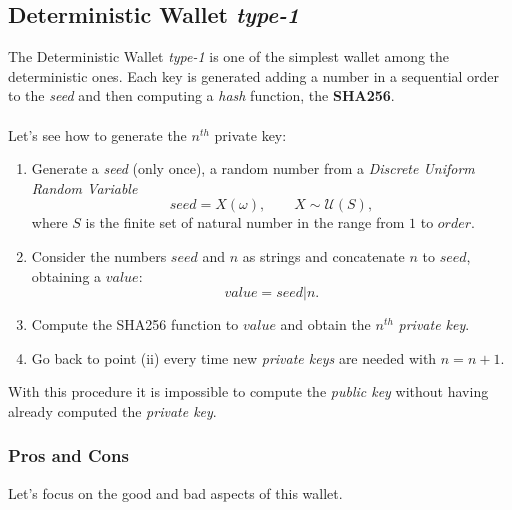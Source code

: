 \subsection{Deterministic Wallet \textit{type-1}}
The Deterministic Wallet \textit{type-1} is one of the simplest wallet among the deterministic ones. Each key is generated adding a number in a sequential order to the \textit{seed} and then computing a \textit{hash} function, the \textbf{SHA256}.
\\ \\
Let's see how to generate the $n^{th}$ private key:

\begin{enumerate}[label=(\roman*)]
	\item Generate a \textit{seed} (only once), a random number from a \textit{Discrete Uniform Random Variable}
	\begin{equation*}
	seed=X(\omega), \qquad X\sim \mathcal{U}(S),
	\end{equation*}
	where $S$ is the finite set of natural number in the range from $1$ to $order$.
	\item Consider the numbers $seed$ and $n$ as strings and concatenate $n$ to $seed$, obtaining a $value$:
	\begin{equation*}
	value=seed|n.
	\end{equation*}
	\item Compute the SHA256 function to $value$ and obtain the $n^{th}$ \textit{private key}.
	\item Go back to point (ii) every time new \textit{private keys} are needed with $n=n+1$. 
\end{enumerate}
With this procedure it is impossible to compute the \textit{public key} without having already computed the \textit{private key}.

\subsubsection{Pros and Cons}
Let's focus on the good and bad aspects of this wallet.

